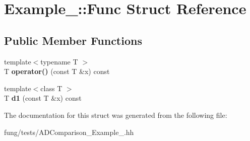 \hypertarget{structExample__1_1_1Func}{\section{Example\-\_\-:\-:Func Struct Reference}
\label{structExample__1_1_1Func}
}
\subsection*{Public Member Functions}
\begin{DoxyCompactItemize}
\item 
\hypertarget{structExample__1_1_1Func_a1c0fcc5358171b54ee9a4a81337b9f32}{{\footnotesize template$<$typename T $>$ }\\T {\bfseries operator()} (const T \&x) const }\label{structExample__1_1_1Func_a1c0fcc5358171b54ee9a4a81337b9f32}

\item 
\hypertarget{structExample__1_1_1Func_aafc45e7fa7254cc45da99d4d0c2be444}{{\footnotesize template$<$class T $>$ }\\T {\bfseries d1} (const T \&x) const }\label{structExample__1_1_1Func_aafc45e7fa7254cc45da99d4d0c2be444}

\end{DoxyCompactItemize}


The documentation for this struct was generated from the following file\-:\begin{DoxyCompactItemize}
\item 
fung/tests/A\-D\-Comparison\-\_\-\-Example\-\_.\-hh\end{DoxyCompactItemize}

